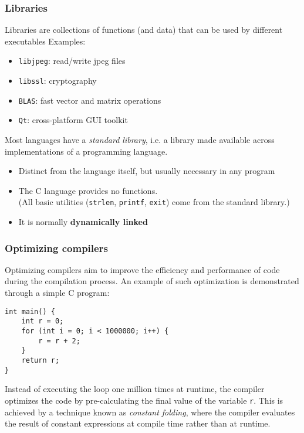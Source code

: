 \documentclass[12pt]{article}
\begin{document}





\subsubsection{Libraries}

Libraries are collections of functions (and data) that can be used by different executables
Examples:
\begin{itemize}
    \item \texttt{libjpeg}: read/write jpeg files
    \item \texttt{libssl}: cryptography
    \item \texttt{BLAS}: fast vector and matrix operations
    \item \texttt{Qt}: cross-platform GUI toolkit
\end{itemize}

Most languages have a \textit{standard library},  i.e. a library made available across implementations of a programming language. 
\begin{itemize}
    \item Distinct from the language itself, but usually necessary in any program
    \item The C language provides no functions. \\
    (All basic utilities (\texttt{strlen}, \texttt{printf}, \texttt{exit}) come from the standard library.)
    \item It is normally \textbf{dynamically linked}
\end{itemize}

\subsubsection{Optimizing compilers}

Optimizing compilers aim to improve the efficiency and performance of code during the compilation process. An example of such optimization is demonstrated through a simple C program:
\begin{verbatim}
int main() {
    int r = 0;
    for (int i = 0; i < 1000000; i++) {
        r = r + 2;
    }
    return r;
}
\end{verbatim}

Instead of executing the loop one million times at runtime, the compiler optimizes the code by pre-calculating the final value of the variable \texttt{r}. This is achieved by a technique known as \textit{constant folding}, where the compiler evaluates the result of constant expressions at compile time rather than at runtime.
\end{document}
